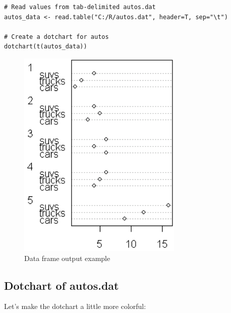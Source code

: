\documentclass[10pt]{book}
\begin{document}
\begin{lstlisting}
# Read values from tab-delimited autos.dat
autos_data <- read.table("C:/R/autos.dat", header=T, sep="\t")

# Create a dotchart for autos
dotchart(t(autos_data))
\end{lstlisting}
\begin{figure}[H]
    \begin{flushleft}
        \includegraphics[width=0.7\textwidth]{dot_script1.png}
        \caption{Data frame output example}
        \label{fig:dataframe}
    \end{flushleft}
\end{figure}

\subsection*{Dotchart of autos.dat}
Let's make the dotchart a little more colorful:
\end{document}
